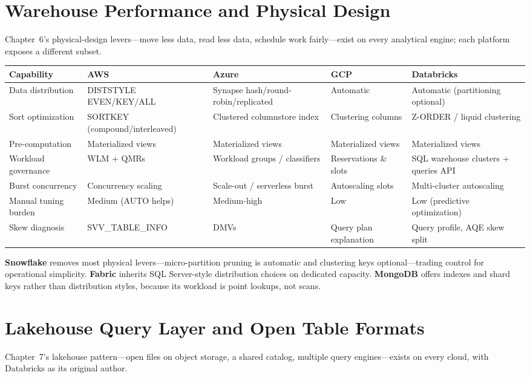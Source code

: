 \section{Warehouse Performance and Physical Design}
%
Chapter~6's physical-design levers---move less data, read less data, schedule work fairly---exist
on every analytical engine; each platform exposes a different subset.

\begin{center}
\footnotesize
\begin{tabular}{@{}p{2.4cm}p{2.9cm}p{2.9cm}p{2.9cm}p{2.9cm}@{}}
\toprule
\textbf{Capability} & \textbf{AWS} & \textbf{Azure} & \textbf{GCP} & \textbf{Databricks} \\
\midrule
Data distribution & DISTSTYLE EVEN/KEY/ALL & Synapse hash/round-robin/replicated & Automatic & Automatic (partitioning optional) \\
Sort optimization & SORTKEY (compound/interleaved) & Clustered columnstore index & Clustering columns & Z-ORDER / liquid clustering \\
Pre-computation & Materialized views & Materialized views & Materialized views & Materialized views \\
Workload governance & WLM + QMRs & Workload groups / classifiers & Reservations \& slots & SQL warehouse clusters + queries API \\
Burst concurrency & Concurrency scaling & Scale-out / serverless burst & Autoscaling slots & Multi-cluster autoscaling \\
\addlinespace
Manual tuning burden & Medium (AUTO helps) & Medium-high & Low & Low (predictive optimization) \\
Skew diagnosis & SVV\_TABLE\_INFO & DMVs & Query plan explanation & Query profile, AQE skew split \\
\bottomrule
\end{tabular}
\end{center}

\noindent \textbf{Snowflake} removes most physical levers---micro-partition pruning is automatic
and clustering keys optional---trading control for operational simplicity. \textbf{Fabric}
inherits SQL Server-style distribution choices on dedicated capacity. \textbf{MongoDB} offers
indexes and shard keys rather than distribution styles, because its workload is point lookups,
not scans.

\section{Lakehouse Query Layer and Open Table Formats}
%
Chapter~7's lakehouse pattern---open files on object storage, a shared catalog, multiple query
engines---exists on every cloud, with Databricks as its original author.

